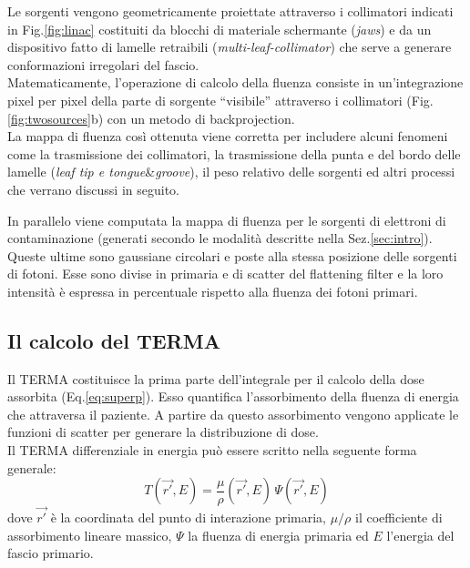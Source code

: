 {Le sorgenti vengono geometricamente proiettate attraverso i collimatori indicati in Fig.\ref{fig:linac} costituiti da blocchi di materiale schermante (\textit{jaws}) e da un dispositivo fatto di lamelle retraibili (\textit{multi-leaf-collimator}) che serve a generare conformazioni irregolari del fascio.\\
Matematicamente, l'operazione di calcolo della fluenza consiste in un'integrazione pixel per pixel della parte di sorgente \textquotedblleft visibile\textquotedblright{} attraverso i collimatori (Fig.\ref{fig:twosources}b) con un metodo di backprojection.\\
La mappa di fluenza così ottenuta viene corretta per includere alcuni fenomeni come la trasmissione dei collimatori, la trasmissione della punta e del bordo delle lamelle (\textit{leaf tip e tongue}\&\textit{groove}), il peso relativo delle sorgenti ed altri processi che verrano discussi in seguito.

In parallelo viene computata la mappa di fluenza per le sorgenti di elettroni di contaminazione (generati secondo le modalità descritte nella Sez.\ref{sec:intro}). Queste ultime sono gaussiane circolari e poste alla stessa posizione delle sorgenti di fotoni. Esse sono divise in primaria e di scatter del flattening filter e la loro intensità è espressa in percentuale rispetto alla fluenza dei fotoni primari.

\subsection{Il calcolo del TERMA}
Il TERMA costituisce la prima parte dell'integrale per il calcolo della dose assorbita (Eq.\ref{eq:superp}). Esso quantifica l'assorbimento della fluenza di energia che attraversa il paziente. A partire da questo assorbimento vengono applicate le funzioni di scatter per generare la distribuzione di dose.\\
Il TERMA differenziale in energia può essere scritto nella seguente forma generale:
\begin{equation}
\label{eq:termaE}
T(\vec{r'},E) = \frac{\mu}{\rho}(\vec{r'},E)\,\Psi(\vec{r'},E)
\end{equation}
dove $\vec{r'}$ è la coordinata del punto di interazione primaria, $\mu/\rho$ il coefficiente di assorbimento lineare massico, $\Psi$ la fluenza di energia primaria ed $E$ l'energia del fascio primario.

}
